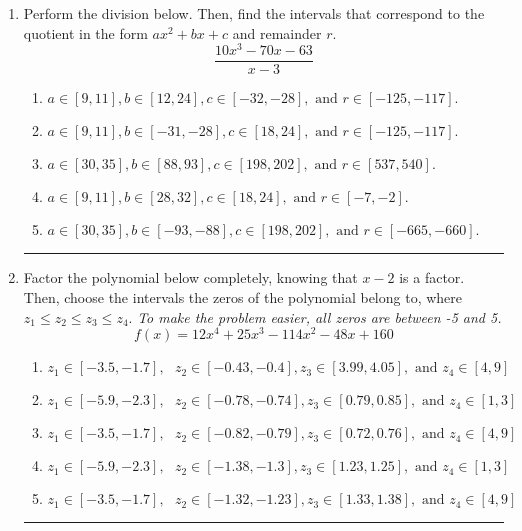 \documentclass[14pt]{extbook}
\newcommand{\litem}[1]{\item#1\hspace*{-1cm}\rule{\textwidth}{0.4pt}}
\begin{document}
\begin{enumerate}
{\begin{enumerate}[label=\Alph*.]
\end{enumerate} }
\litem{
Perform the division below. Then, find the intervals that correspond to the quotient in the form $ax^2+bx+c$ and remainder $r$.\[ \frac{10x^{3} -70 x -63}{x -3} \]\begin{enumerate}[label=\Alph*.]
\item \( a \in [9, 11], b \in [12, 24], c \in [-32, -28], \text{ and } r \in [-125, -117]. \)
\item \( a \in [9, 11], b \in [-31, -28], c \in [18, 24], \text{ and } r \in [-125, -117]. \)
\item \( a \in [30, 35], b \in [88, 93], c \in [198, 202], \text{ and } r \in [537, 540]. \)
\item \( a \in [9, 11], b \in [28, 32], c \in [18, 24], \text{ and } r \in [-7, -2]. \)
\item \( a \in [30, 35], b \in [-93, -88], c \in [198, 202], \text{ and } r \in [-665, -660]. \)

\end{enumerate} }
\litem{
Factor the polynomial below completely, knowing that $x-2$ is a factor. Then, choose the intervals the zeros of the polynomial belong to, where $z_1 \leq z_2 \leq z_3 \leq z_4$. \textit{To make the problem easier, all zeros are between -5 and 5.}\[ f(x) = 12x^{4} +25 x^{3} -114 x^{2} -48 x + 160 \]\begin{enumerate}[label=\Alph*.]
\item \( z_1 \in [-3.5, -1.7], \text{   }  z_2 \in [-0.43, -0.4], z_3 \in [3.99, 4.05], \text{   and   } z_4 \in [4, 9] \)
\item \( z_1 \in [-5.9, -2.3], \text{   }  z_2 \in [-0.78, -0.74], z_3 \in [0.79, 0.85], \text{   and   } z_4 \in [1, 3] \)
\item \( z_1 \in [-3.5, -1.7], \text{   }  z_2 \in [-0.82, -0.79], z_3 \in [0.72, 0.76], \text{   and   } z_4 \in [4, 9] \)
\item \( z_1 \in [-5.9, -2.3], \text{   }  z_2 \in [-1.38, -1.3], z_3 \in [1.23, 1.25], \text{   and   } z_4 \in [1, 3] \)
\item \( z_1 \in [-3.5, -1.7], \text{   }  z_2 \in [-1.32, -1.23], z_3 \in [1.33, 1.38], \text{   and   } z_4 \in [4, 9] \)


\end{enumerate}}
\end{enumerate}
\end{document}
